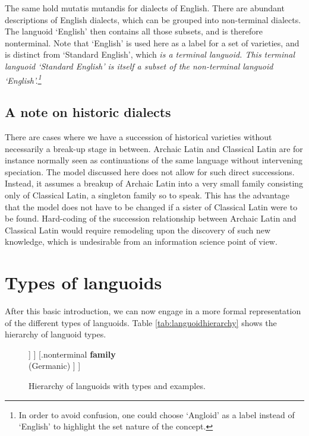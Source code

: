 \documentclass[a4paper,10pt]{article}
\begin{document}
The same hold mutatis mutandis for dialects of English. There are abundant descriptions of English dialects, which can be grouped into non-terminal dialects. The languoid `English' then contains all those subsets, and is therefore nonterminal. Note that `English' is used here as a label for a set of varieties, and is distinct from `Standard English', which \em is \em a terminal languoid. This terminal languoid `Standard English' is itself a subset of the non-terminal languoid `English'.\footnote{In order to avoid confusion, one could choose `Angloid' as a label instead of `English' to highlight the set nature of the concept.}

\subsection{A note on historic dialects}
There are cases where we have a succession of historical varieties without necessarily a break-up stage in between. Archaic Latin and Classical Latin are for instance normally seen as continuations of the same language without intervening speciation. The model discussed here does not allow for such direct successions. Instead, it assumes a breakup of Archaic Latin into a very small family consisting only of Classical Latin, a singleton family so to speak. This has the advantage that the model does not have to be changed if a sister of Classical Latin were to be found. Hard-coding of the succession relationship between Archaic Latin and Classical Latin would require remodeling upon the discovery of such new knowledge, which is undesirable from an information science point of view.


\section{Types of languoids}

After this basic introduction, we can now engage in a more formal representation of the different types of languoids. Table \ref{tab:languoidhierarchy} shows the hierarchy of languoid types.

\begin{figure}
\Tree   [.languoid   [.terminal [.living \textbf{living\ language}\\(Kölsch) ] [.extinct [.without\ offspring \textbf{extinct\ lineage}\\(Gothic) ] [.with\ offspring \textbf{paleolect}\\(Latin,Proto-Dravidian) 
] ] ] [.nonterminal \textbf{family}\\(Germanic) ]  ] 
\caption{Hierarchy of languoids with types and examples.}
\label{fig:languoidhierarchy}
\end{figure}
\end{document}
